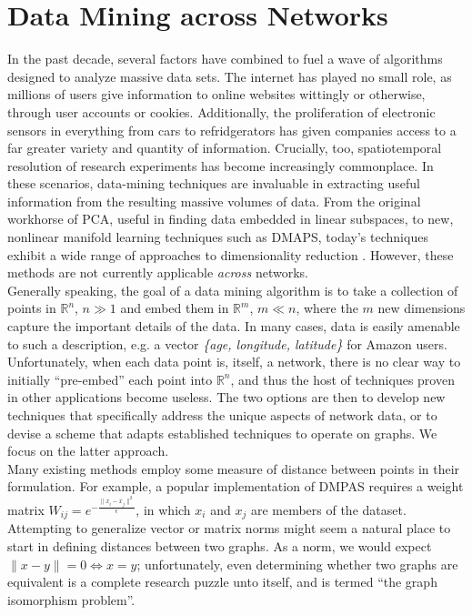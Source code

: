 \documentclass[11pt]{article}
\begin{document}
\section{Data Mining across Networks}
\label{sec:DM}
\indent In the past decade, several factors have combined to fuel a wave of algorithms designed to analyze massive data sets. The internet has played no small role, as millions of users give information to online websites wittingly or otherwise, through user accounts or cookies. Additionally, the proliferation of electronic sensors in everything from cars to refridgerators has given companies access to a far greater variety and quantity of information. Crucially, too, spatiotemporal resolution of research experiments has become increasingly commonplace. In these scenarios, data-mining techniques are invaluable in extracting useful information from the resulting massive volumes of data. From the original workhorse of PCA, useful in finding data embedded in linear subspaces, to new, nonlinear manifold learning techniques such as DMAPS, today's techniques exhibit a wide range of approaches to dimensionality reduction \cite{data mining papers}. However, these methods are not currently applicable \textit{across} networks. \vspace{1mm}\\ 
\indent Generally speaking, the goal of a data mining algorithm is to take a collection of points in $\mathbb{R}^{n}$, $n\gg1$ and embed them in $\mathbb{R}^{m}$, $m \ll n$, where the $m$ new dimensions capture the important details of the data. In many cases, data is easily amenable to such a description, e.g. a vector \textit{\{age, longitude, latitude\}} for Amazon users. Unfortunately, when each data point is, itself, a network, there is no clear way to initially ``pre-embed'' each point into $\mathbb{R}^{n}$, and thus the host of techniques proven in other applications become useless. The two options are then to develop new techniques that specifically address the unique aspects of network data, or to devise a scheme that adapts established techniques to operate on graphs. We focus on the latter approach. \vspace{1mm}\\
\indent Many existing methods employ some measure of distance between points in their formulation. For example, a popular implementation of DMPAS requires a weight matrix $W_{ij}=e^{-\frac{\|x_{i}-x_{j}\|^{2}}{\epsilon}}$, in which $x_{i}$ and $x_{j}$ are members of the dataset. Attempting to generalize vector or matrix norms might seem a natural place to start in defining distances between two graphs. As a norm, we would expect $\| x - y \| = 0 \Leftrightarrow x = y$; unfortunately, even determining whether two graphs are equivalent is a complete research puzzle unto itself, and is termed ``the graph isomorphism problem''.
\end{document}
